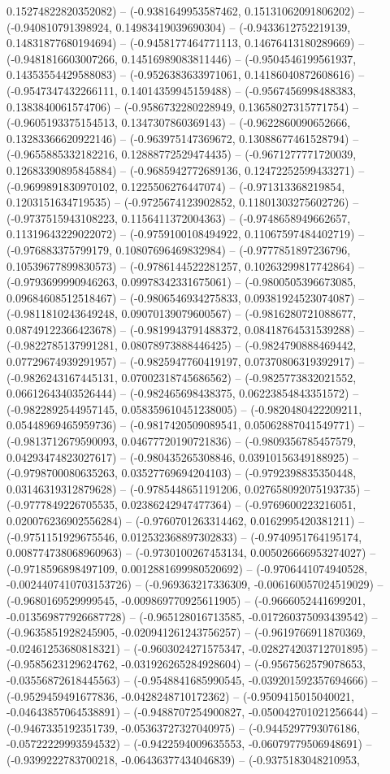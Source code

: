 0.15274822820352082) -- (-0.9381649953587462, 0.15131062091806202) -- (-0.940810791398924, 0.14983419039690304) -- (-0.9433612752219139, 0.14831877680194694) -- (-0.9458177464771113, 0.14676413180289669) -- (-0.9481816603007266, 0.14516989083811446) -- (-0.9504546199561937, 0.14353554429588083) -- (-0.9526383633971061, 0.14186040872608616) -- (-0.9547347432266111, 0.14014359945159488) -- (-0.9567456998488383, 0.1383840061574706) -- (-0.9586732280228949, 0.13658027315771754) -- (-0.9605193375154513, 0.1347307860369143) -- (-0.9622860090652666, 0.13283366620922146) -- (-0.963975147369672, 0.13088677461528794) -- (-0.9655885332182216, 0.12888772529474435) -- (-0.9671277771720039, 0.12683390895845884) -- (-0.9685942772689136, 0.12472252599433271) -- (-0.9699891830970102, 0.1225506276447074) -- (-0.971313368219854, 0.1203151634719535) -- (-0.9725674123902852, 0.11801303275602726) -- (-0.9737515943108223, 0.1156411372004363) -- (-0.9748658949662657, 0.11319643229022072) -- (-0.9759100108494922, 0.11067597484402719) -- (-0.976883375799179, 0.10807696469832984) -- (-0.9777851897236796, 0.10539677899830573) -- (-0.9786144522281257, 0.10263299817742864) -- (-0.9793699990946263, 0.09978342331675061) -- (-0.9800505396673085, 0.09684608512518467) -- (-0.9806546934275833, 0.09381924523074087) -- (-0.9811810243649248, 0.09070139079600567) -- (-0.9816280721088677, 0.08749122366423678) -- (-0.9819943791488372, 0.08418764531539288) -- (-0.9822785137991281, 0.08078973888446425) -- (-0.9824790888469442, 0.07729674939291957) -- (-0.9825947760419197, 0.07370806319392917) -- (-0.9826243167445131, 0.07002318745686562) -- (-0.9825773832021552, 0.06612643403526444) -- (-0.982465698438375, 0.06223854843351572) -- (-0.9822892544957145, 0.058359610451238005) -- (-0.9820480422209211, 0.05448969465959736) -- (-0.9817420509089541, 0.05062887041549771) -- (-0.9813712679590093, 0.04677720190721836) -- (-0.9809356785457579, 0.04293474823027617) -- (-0.980435265308846, 0.03910156349188925) -- (-0.9798700080635263, 0.03527769694204103) -- (-0.9792398835350448, 0.03146319312879628) -- (-0.9785448651191206, 0.027658092075193735) -- (-0.9777849226705535, 0.02386242947477364) -- (-0.9769600223216051, 0.020076236902556284) -- (-0.9760701263314462, 0.0162995420381211) -- (-0.9751151929675546, 0.012532368897302833) -- (-0.9740951764195174, 0.008774738068960963) -- (-0.9730100267453134, 0.005026666953274027) -- (-0.9718596898497109, 0.0012881699980520692) -- (-0.9706441074940528, -0.0024407410703153726) -- (-0.969363217336309, -0.006160057024519029) -- (-0.9680169529999545, -0.009869770925611905) -- (-0.9666052441699201, -0.013569877926687728) -- (-0.965128016713585, -0.017260375093439542) -- (-0.9635851928245905, -0.020941261243756257) -- (-0.9619766911870369, -0.02461253680818321) -- (-0.9603024271575347, -0.028274203712701895) -- (-0.9585623129624762, -0.031926265284928604) -- (-0.9567562579078653, -0.03556872618445563) -- (-0.9548841685990545, -0.039201592357694666) -- (-0.9529459491677836, -0.0428248710172362) -- (-0.9509415015040021, -0.04643857064538891) -- (-0.9488707254900827, -0.050042701021256644) -- (-0.9467335192351739, -0.05363727327040975) -- (-0.9445297793076186, -0.05722229993594532) -- (-0.9422594009635553, -0.06079779506948691) -- (-0.9399222783700218, -0.06436377434046839) -- (-0.9375183048210953, 